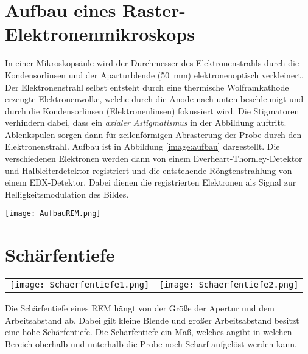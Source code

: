 \section{Aufbau eines Raster-Elektronenmikroskops}
\label{sec:aufbau}
In einer Mikroskopsäule wird der Durchmesser des Elektronenstrahls durch die Kondensorlinsen und der Aparturblende (\SI{50}{\milli\metre}) elektronenoptisch verkleinert. Der Elektronenstrahl selbst entsteht durch eine thermische Wolframkathode erzeugte Elektronenwolke, welche durch die Anode nach unten beschleunigt und durch die Kondensorlinsen (Elektronenlinsen) fokussiert wird. Die Stigmatoren verhindern dabei, dass ein \textit{axialer Astigmatismus} in der Abbildung auftritt. Ablenkspulen sorgen dann  für zeilenförmigen Abrasterung der Probe durch den Elektronenstrahl. \citep{RasterEM} Aufbau ist in Abbildung \ref{image:aufbau} dargestellt. Die verschiedenen Elektronen werden dann von einem Everheart-Thornley-Detektor und Halbleiterdetektor registriert und die entstehende Röngtenstrahlung von einem EDX-Detektor. Dabei dienen die registrierten Elektronen als Signal zur Helligkeitsmodulation des Bildes. \citep{RasterEM}
\begin{center}
    \texttt{[image: AufbauREM.png]}
    \label{image:aufbau}
\end{center}
\section*{Schärfentiefe}
\begin{center}
    \begin{tabular}{cc}
        \texttt{[image: Schaerfentiefe1.png]} & \texttt{[image: Schaerfentiefe2.png]}
    \end{tabular}
\end{center}
Die Schärfentiefe eines REM hängt von der Größe der Apertur und dem Arbeitsabstand ab. Dabei gilt kleine Blende und großer Arbeitsabstand besitzt eine hohe Schärfentiefe. Die Schärfentiefe ein Maß, welches angibt in welchen Bereich oberhalb und unterhalb die Probe noch Scharf aufgelöst werden kann.

